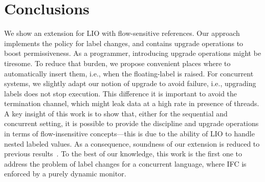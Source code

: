 \section{Conclusions}

We show an extension for LIO with flow-sensitive references. Our approach
implements the {\nsu} policy for label changes, and contains upgrade operations
to boost permissiveness. As a programmer, introducing upgrade operations might
be tiresome. To reduce that burden, we propose convenient places where to
automatically insert them, i.e., when the floating-label is raised. For
concurrent systems, we slightly adapt our notion of upgrade to avoid failure,
i.e., upgrading labels does not stop execution. This difference it is important
to avoid the termination channel, which might leak data at a high rate in
presence of threads. A key insight of this work is to show that, either for the
sequential and concurrent setting, it is possible to provide the discipline {\nsu}
and upgrade operations in terms of flow-insensitive concepts---this is due to 
the ability of LIO to handle nested labeled values. As a consequence,
soundness of our extension is reduced to previous
results~\cite{stefan:lio,stefan:addressing-covert}. To the best of our
knowledge, this work is the first one to address the problem of label changes
for a concurrent language, where IFC is enforced by a purely dynamic monitor.

